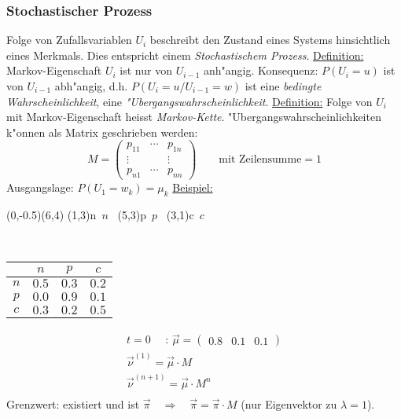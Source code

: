 \subsubsection{Stochastischer Prozess}
Folge von Zufallsvariablen $U_i$ beschreibt den Zustand eines Systems hinsichtlich
eines Merkmals. Dies entspricht einem {\em Stochastischem Prozess}.
\newline
\newline
\underline{Definition:} Markov-Eigenschaft $U_i$ ist nur von $U_{i-1}$ anh"angig.
Konsequenz: $P(U_i=u)$ ist von $U_{i-1}$ abh"angig, d.h. $P(U_i=u / U_{i-1}=w)$ ist
eine {\em bedingte Wahrscheinlichkeit}, eine {\em "Ubergangswahrscheinlichkeit}.
\newline
\newline
\underline{Definition:} Folge von $U_i$ mit Markov-Eigenschaft heisst {\em Markov-Kette}.
"Ubergangswahrscheinlichkeiten k"onnen als Matrix geschrieben werden:
\begin{equation*}
	M=\begin{pmatrix}
		p_{11} & \cdots & p_{1n} \\
		\vdots & & \vdots \\
		p_{n1} & \cdots & p_{nn}
	\end{pmatrix}\qquad\text{mit Zeilensumme} = 1
\end{equation*}
Ausgangslage: $P(U_1=w_k)=\mu_k$
\newline
\newline
\underline{Beispiel:}
\begin{center}
	\begin{pspicture}(0,-0.5)(6,4)
		\cnodeput[fillcolor=lightgray,fillstyle=solid](1,3){n}{~$n$~}
		\cnodeput[fillcolor=lightgray,fillstyle=solid](5,3){p}{~$p$~}
		\cnodeput[fillcolor=lightgray,fillstyle=solid](3,1){c}{~$c$~}
	\end{pspicture} \\
	\vspace{5mm}
	\begin{tabular}{c|ccc}
		& $n$ & $p$ & $c$ \\
	\hline
		$n$ & $0.5$ & $0.3$ & $0.2$ \\
		$p$ & $0.0$ & $0.9$ & $0.1$ \\
		$c$ & $0.3$ & $0.2$ & $0.5$
	\end{tabular}
\end{center}
\begin{gather*}
	t=0\quad\text{ : }\Vec{\mu}=\begin{pmatrix}0.8& 0.1 & 0.1\end{pmatrix} \\
	\Vec{\nu}^{(1)} = \Vec{\mu}\cdot M \\
	\Vec{\nu}^{(n+1)} = \Vec{\mu}\cdot M^n \\
\end{gather*}
Grenzwert: existiert und ist $\Vec{\pi}\quad\Longrightarrow\quad\Vec{\pi}=\Vec{\pi}\cdot M$
(nur Eigenvektor zu $\lambda=1$).

